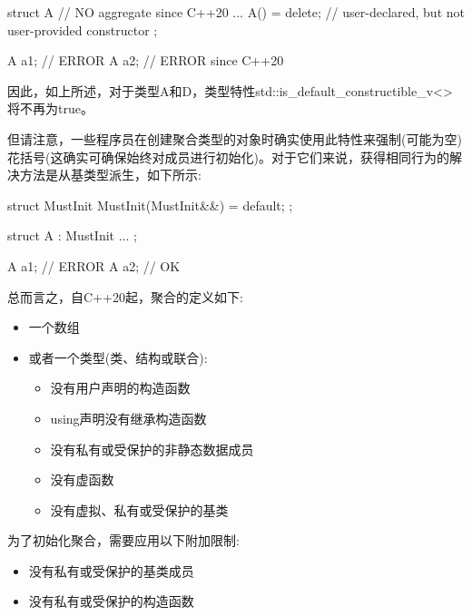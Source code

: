 \begin{cpp}
struct A { // NO aggregate since C++20
	...
	A() = delete; // user-declared, but not user-provided constructor
};

A a1; // ERROR
A a2{}; // ERROR since C++20
\end{cpp}

因此，如上所述，对于类型A和D，类型特性std::is\_default\_constructible\_v<>将不再为true。

但请注意，一些程序员在创建聚合类型的对象时确实使用此特性来强制(可能为空)花括号(这确实可确保始终对成员进行初始化)。对于它们来说，获得相同行为的解决方法是从基类型派生，如下所示:

\begin{cpp}
struct MustInit {
	MustInit(MustInit&&) = default;
};

struct A : MustInit {
	...
};

A a1; // ERROR
A a2{}; // OK
\end{cpp}

总而言之，自C++20起，聚合的定义如下:

\begin{itemize}
\item 
一个数组

\item
或者一个类型(类、结构或联合):

\begin{itemize}
\item 
没有用户声明的构造函数

\item
using声明没有继承构造函数

\item
没有私有或受保护的非静态数据成员

\item
没有虚函数

\item
没有虚拟、私有或受保护的基类
\end{itemize}

\end{itemize}

为了初始化聚合，需要应用以下附加限制:

\begin{itemize}
\item 
没有私有或受保护的基类成员

\item 
没有私有或受保护的构造函数
\end{itemize}











